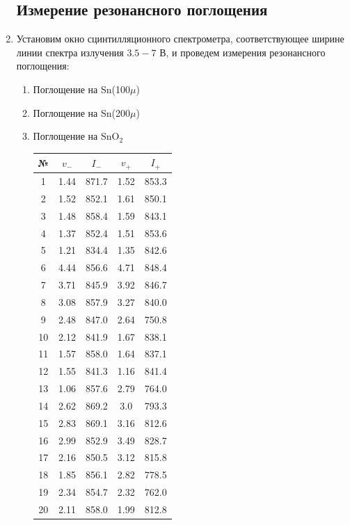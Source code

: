 \documentclass[a4paper, 12pt]{article}
\begin{document}
\begin{enumerate}
		\subsection{Измерение резонансного поглощения}
		\item Установим окно сцинтилляционного спектрометра, соответствующее ширине линии спектра излучения $3.5-7$ В, и проведем измерения резонансного поглощения:
		\begin{enumerate}
			\item Поглощение на Sn(100$\mu$)
			\item Поглощение на Sn(200$\mu$)
			\item Поглощение на SnO$_2$
			\begin{table}[h]
				\begin{minipage}{0.49\textwidth}
				\begin{tabular}{|c|c|c|c|c|}
					\hline
					№ & $v_-$ & $I_-$ & $v_+$ & $I_+$\\
					\hline
					1 & 1.44 & 871.7 & 1.52 & 853.3 \\
 					2 & 1.52 & 852.1 & 1.61 & 850.1 \\
				 	3 & 1.48 & 858.4 & 1.59 & 843.1 \\
 					4 & 1.37 & 852.4 & 1.51 & 853.6 \\
 					5 & 1.21 & 834.4 & 1.35 & 842.6 \\
 					6 & 4.44 & 856.6 & 4.71 & 848.4 \\
 					7 & 3.71 & 845.9 & 3.92 & 846.7 \\
 					8 & 3.08 & 857.9 & 3.27 & 840.0 \\
 					9 & 2.48 & 847.0 & 2.64 & 750.8 \\
 					10 & 2.12 & 841.9 & 1.67 & 838.1 \\
 					11 & 1.57 & 858.0 & 1.64 & 837.1 \\
	 				12 & 1.55 & 841.3 & 1.16 & 841.4 \\
 					13 & 1.06 & 857.6 & 2.79 & 764.0 \\
 					14 & 2.62 & 869.2 & 3.0 & 793.3 \\
 					15 & 2.83 & 869.1 & 3.16 & 812.6 \\
 					16 & 2.99 & 852.9 & 3.49 & 828.7 \\
 					17 & 2.16 & 850.5 & 3.12 & 815.8 \\
 					18 & 1.85 & 856.1 & 2.82 & 778.5 \\
 					19 & 2.34 & 854.7 & 2.32 & 762.0 \\
 					20 & 2.11 & 858.0 & 1.99 & 812.8 \\

\end{tabular}
\end{minipage}
\end{table}
\end{enumerate}
\end{enumerate}
\end{document}
